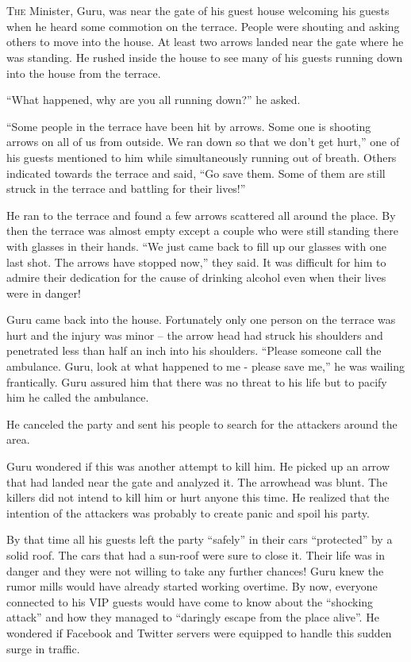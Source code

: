 \chapter{}

\lettrine{T}{he} Minister, Guru, was near the gate of his guest house welcoming his guests
when he heard some commotion on the terrace. People were shouting and asking
others to move into the house. At least two arrows landed near the gate where he
was standing. He rushed inside the house to see many of his guests running down
into the house from the terrace.

“What happened, why are you all running down?” he asked.

“Some people in the terrace have been hit by arrows. Some one is shooting arrows
on all of us from outside. We ran down so that we don't get hurt,” one of his
guests mentioned to him while simultaneously running out of breath. Others
indicated towards the terrace and said, “Go save them. Some of them are still
struck in the terrace and battling for their lives!”

He ran to the terrace and found a few arrows scattered all around the place. By
then the terrace was almost empty except a couple who were still standing there
with glasses in their hands. “We just came back to fill up our glasses with one
last shot. The arrows have stopped now,” they said. It was difficult for him to
admire their dedication for the cause of drinking alcohol even when their lives
were in danger!

Guru came back into the house. Fortunately only one person on the terrace was
hurt and the injury was minor – the arrow head had struck his shoulders and
penetrated less than half an inch into his shoulders. “Please someone call the
ambulance. Guru, look at what happened to me - please save me,” he was wailing
frantically. Guru assured him that there was no threat to his life but to pacify
him he called the ambulance.

He canceled the party and sent his people to search for the attackers around the
area.

Guru wondered if this was another attempt to kill him. He picked up an arrow
that had landed near the gate and analyzed it. The arrowhead was blunt. The
killers did not intend to kill him or hurt anyone this time. He realized that
the intention of the attackers was probably to create panic and spoil his party.

By that time all his guests left the party “safely” in their cars “protected” by
a solid roof. The cars that had a sun-roof were sure to close it. Their life was
in danger and they were not willing to take any further chances! Guru knew the
rumor mills would have already started working overtime. By now, everyone
connected to his VIP guests would have come to know about the “shocking attack”
and how they managed to “daringly escape from the place alive”. He wondered if
Facebook and Twitter servers were equipped to handle this sudden surge in
traffic.

